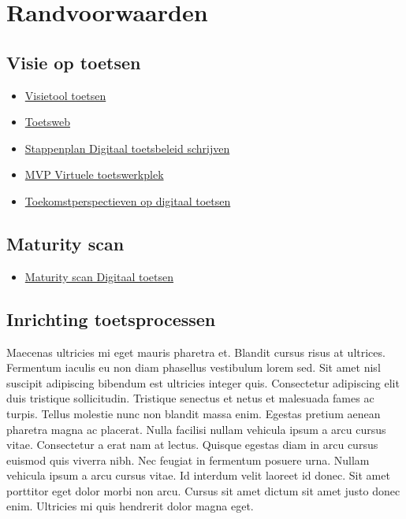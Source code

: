 \documentclass[
  letterpaper,
  DIV=11,
  numbers=noendperiod]{scrreprt}
\providecommand{\tightlist}{%
  \setlength{\itemsep}{0pt}\setlength{\parskip}{0pt}}\usepackage{longtable,booktabs,array}
\begin{document}

\hypertarget{randvoorwaarden}{%
\chapter{Randvoorwaarden}\label{randvoorwaarden}}

\hypertarget{visie-op-toetsen}{%
\section{Visie op toetsen}\label{visie-op-toetsen}}

\begin{itemize}
\item
  \href{https://werkgroep-toetsen-op-afstand.github.io/visietool-toetsen/}{Visietool
  toetsen}
\item
  \href{https://toetsweb.netlify.app}{Toetsweb}
\item
  \href{https://www.surf.nl/files/2019-02/stappenplan-digitaal-toetsbeleid-schrijven_webversie.pdf}{Stappenplan
  Digitaal toetsbeleid schrijven}
\item
  \href{https://www.surf.nl/virtuele-toetswerkplek}{MVP Virtuele
  toetswerkplek}
\item
  \href{https://www.versnellingsplan.nl/wp-content/uploads/2022/10/Toekomstperspectief-op-digitaal-toetsen-en-beoordelen.pdf}{Toekomstperspectieven
  op digitaal toetsen}
\end{itemize}

\hypertarget{maturity-scan}{%
\section{Maturity scan}\label{maturity-scan}}

\begin{itemize}
\tightlist
\item
  \href{https://www.surf.nl/files/2019-01/surf-maturityscan-digitaal-toetsen.pdf}{Maturity
  scan Digitaal toetsen}
\end{itemize}

\hypertarget{inrichting-toetsprocessen}{%
\section{Inrichting toetsprocessen}\label{inrichting-toetsprocessen}}

Maecenas ultricies mi eget mauris pharetra et. Blandit cursus risus at
ultrices. Fermentum iaculis eu non diam phasellus vestibulum lorem sed.
Sit amet nisl suscipit adipiscing bibendum est ultricies integer quis.
Consectetur adipiscing elit duis tristique sollicitudin. Tristique
senectus et netus et malesuada fames ac turpis. Tellus molestie nunc non
blandit massa enim. Egestas pretium aenean pharetra magna ac placerat.
Nulla facilisi nullam vehicula ipsum a arcu cursus vitae. Consectetur a
erat nam at lectus. Quisque egestas diam in arcu cursus euismod quis
viverra nibh. Nec feugiat in fermentum posuere urna. Nullam vehicula
ipsum a arcu cursus vitae. Id interdum velit laoreet id donec. Sit amet
porttitor eget dolor morbi non arcu. Cursus sit amet dictum sit amet
justo donec enim. Ultricies mi quis hendrerit dolor magna eget.
\end{document}
